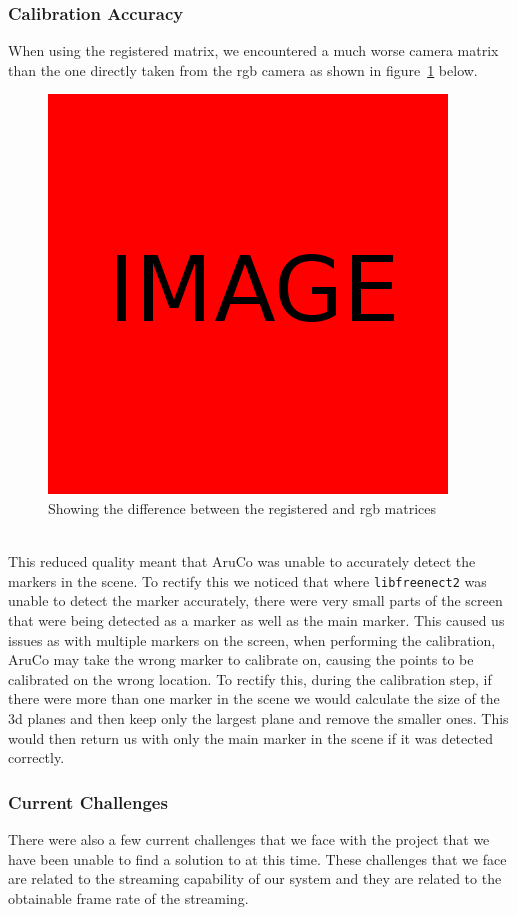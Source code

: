 \documentclass{article}
\begin{document}
\subsubsection{Calibration Accuracy}
When using the registered matrix, we encountered a much worse camera matrix than the one directly taken from the rgb camera as shown in figure~\ref{fig:registeredaccuracy} below.
\begin{figure}[h]
  \centering
  \includegraphics[scale=0.3]{placeholder}
  \caption{Showing the difference between the registered and rgb matrices}
  \label{fig:registeredaccuracy}
\end{figure}
\\
This reduced quality meant that AruCo was unable to accurately detect the markers in the scene. To rectify this we noticed that where \texttt{libfreenect2} was unable to detect the marker accurately, there were very small parts of the screen that were being detected as a marker as well as the main marker. This caused us issues as with multiple markers on the screen, when performing the calibration, AruCo may take the wrong marker to calibrate on, causing the points to be calibrated on the wrong location. To rectify this, during the calibration step, if there were more than one marker in the scene we would calculate the size of the 3d planes and then keep only the largest plane and remove the smaller ones. This would then return us with only the main marker in the scene if it was detected correctly.
\subsubsection{Current Challenges}
There were also a few current challenges that we face with the project that we have been unable to find a solution to at this time. These challenges that we face are related to the streaming capability of our system and they are related to the obtainable frame rate of the streaming.
\end{document}
